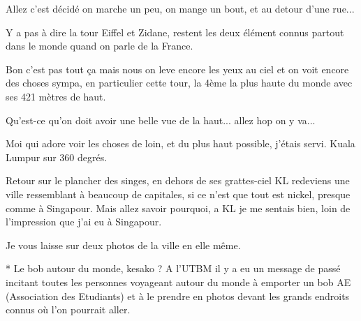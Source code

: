 \begin{multicols}{2}
Allez c'est décidé on marche un peu, on mange un bout, et au detour d'une rue...


Y a pas à dire la tour Eiffel et Zidane, restent les deux élément connus partout dans le monde quand on parle de la France.

Bon c'est pas tout ça mais nous on leve encore les yeux au ciel et on voit encore des choses sympa, en particulier cette tour, la 4ème la plus haute du monde avec ses 421 mètres de haut.


Qu'est-ce qu'on doit avoir une belle vue de la haut... allez hop on y va...


Moi qui adore voir les choses de loin, et du plus haut possible, j'étais servi. Kuala Lumpur sur 360 degrés.

Retour sur le plancher des singes, en dehors de ses grattes-ciel KL redeviens une ville ressemblant à beaucoup de capitales, si ce n'est que tout est nickel, presque comme à Singapour. Mais allez savoir pourquoi, a KL je me sentais bien, loin de l'impression que j'ai eu à Singapour.

Je vous laisse sur deux photos de la ville en elle même.



\end{multicols}

 * Le bob autour du monde, kesako ? A l'UTBM il y a eu un message de passé incitant toutes les personnes voyageant autour du monde à emporter un bob AE (Association des Etudiants) et à le prendre en photos devant les grands endroits connus où l'on pourrait aller.


